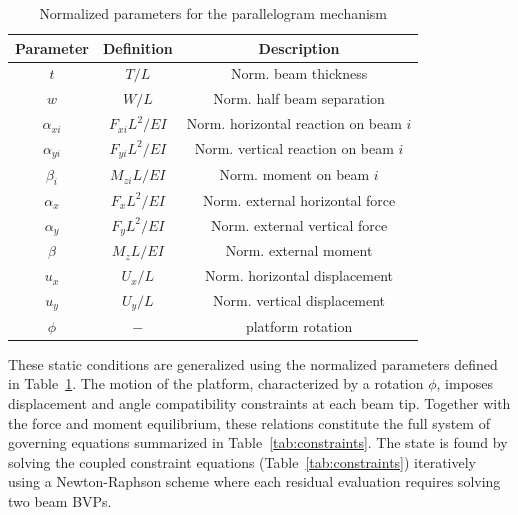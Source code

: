 \documentclass[colorlinks,upint,subscriptcorrection,varvw,hyphenate,balance]{asmeconf} %
\begin{document}
\begin{table}[ht]
\centering
\caption{Normalized parameters for the parallelogram mechanism}
\label{tab:para_normalization}
\begin{tabular}{@{}ccc@{}}
\toprule
\textbf{Parameter} & \textbf{Definition} & \textbf{Description} \\
\midrule
$t$ & $T/L$ & Norm. beam thickness\\
$w$ & $W/L$ & Norm. half beam separation \\
$\alpha_{xi}$ & $F_{xi} L^2 / EI$ & Norm. horizontal reaction on beam $i$ \\
$\alpha_{yi}$ & $F_{yi} L^2 / EI$ & Norm. vertical reaction on beam $i$ \\
$\beta_i$ & $M_{zi} L / EI$ & Norm. moment on beam $i$ \\
$\alpha_x$ & $F_x L^2 / EI$ & Norm. external horizontal force \\
$\alpha_y$ & $F_y L^2 / EI$ & Norm. external vertical force \\
$\beta$ & $M_z L / EI$ & Norm. external moment \\
$u_x$ & $U_x/L$ & Norm. horizontal displacement \\
$u_y$ & $U_y/L$ & Norm. vertical displacement \\
$\phi$ & $-$ & platform rotation \\
\bottomrule
\end{tabular}
\end{table}

These static conditions are generalized using the normalized parameters defined in Table~\ref{tab:para_normalization}. The motion of the platform, characterized by a rotation $\phi$, imposes displacement and angle compatibility constraints at each beam tip. Together with the force and moment equilibrium, these relations constitute the full system of governing equations summarized in Table~\ref{tab:constraints}. The state is found by solving the coupled constraint equations (Table~\ref{tab:constraints}) iteratively using a Newton-Raphson scheme where each residual evaluation requires solving two beam BVPs.
\end{document}
